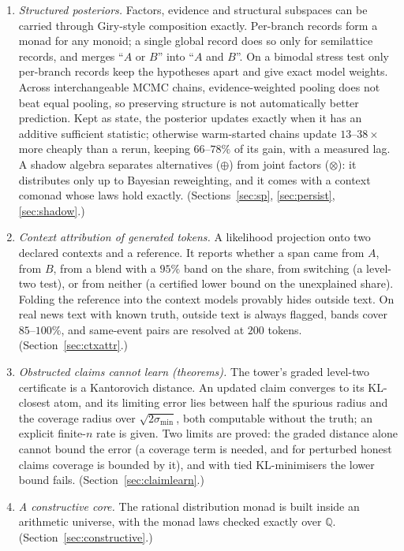 \documentclass[11pt]{article}
\theoremstyle{definition}
\theoremstyle{remark}
\newcommand{\Q}{\mathbb{Q}}
\begin{document}
\begin{enumerate}
  \item \emph{Structured posteriors.} Factors, evidence and structural subspaces can be carried through Giry-style composition exactly. Per-branch records form a monad for any monoid; a single global record does so only for semilattice records, and merges ``$A$ or $B$'' into ``$A$ and $B$''. On a bimodal stress test only per-branch records keep the hypotheses apart and give exact model weights. Across interchangeable MCMC chains, evidence-weighted pooling does not beat equal pooling, so preserving structure is not automatically better prediction. Kept as state, the posterior updates exactly when it has an additive sufficient statistic; otherwise warm-started chains update $13$--$38\times$ more cheaply than a rerun, keeping $66$--$78\%$ of its gain, with a measured lag. A shadow algebra separates alternatives ($\oplus$) from joint factors ($\otimes$): it distributes only up to Bayesian reweighting, and it comes with a context comonad whose laws hold exactly. (Sections~\ref{sec:sp}, \ref{sec:persist}, \ref{sec:shadow}.)
  \item \emph{Context attribution of generated tokens.} A likelihood projection onto two declared contexts and a reference. It reports whether a span came from $A$, from $B$, from a blend with a $95\%$ band on the share, from switching (a level-two test), or from neither (a certified lower bound on the unexplained share). Folding the reference into the context models provably hides outside text. On real news text with known truth, outside text is always flagged, bands cover $85$--$100\%$, and same-event pairs are resolved at $200$ tokens. (Section~\ref{sec:ctxattr}.)
  \item \emph{Obstructed claims cannot learn (theorems).} The tower's graded level-two certificate is a Kantorovich distance. An updated claim converges to its KL-closest atom, and its limiting error lies between half the spurious radius and the coverage radius over $\sqrt{2\sigma_{\min}}$, both computable without the truth; an explicit finite-$n$ rate is given. Two limits are proved: the graded distance alone cannot bound the error (a coverage term is needed, and for perturbed honest claims coverage is bounded by it), and with tied KL-minimisers the lower bound fails. (Section~\ref{sec:claimlearn}.)
  \item \emph{A constructive core.} The rational distribution monad is built inside an arithmetic universe, with the monad laws checked exactly over $\Q$. (Section~\ref{sec:constructive}.)
\end{enumerate}
\end{document}
